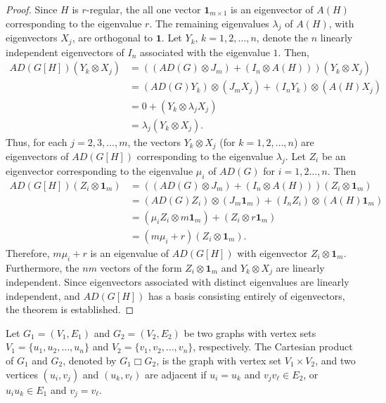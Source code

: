 \documentclass[12pt]{article}
\numberwithin{equation}{section}
\begin{document}
\begin{proof}
		Since $H$ is $r$-regular, the all one vector $\bm{1}_{m \times 1}$ is an eigenvector of $A(H)$ corresponding to the eigenvalue $r$. The remaining eigenvalues $\lambda_j$ of $A(H)$, with eigenvectors $X_j$, are orthogonal to $\bm{1}$. Let $Y_k$, $k = 1,2,\dots,n$, denote the $n$ linearly independent eigenvectors of $I_n$ associated with the eigenvalue $1$. Then, 
			 	\[\begin{aligned}
			AD(G[H]) (Y_k \otimes X_j)& =\left((AD(G) \otimes J_m) + (I_n \otimes A(H))\right) (Y_k \otimes X_j)\\
			&= (AD(G) Y_k) \otimes (J_m X_j) + (I_n Y_k) \otimes (A(H) X_j)\\
			&= 0 + (Y_k \otimes \lambda_j X_j)\\
			&= \lambda_j (Y_k \otimes X_j).
		\end{aligned}\]
		Thus,	for each $j = 2,3,\dots,m$, the vectors $Y_k \otimes X_j$ (for $k = 1,2,\dots,n$) are eigenvectors of $AD(G[H])$ corresponding to the eigenvalue $\lambda_j$. 		
		Let $Z_i$ be an eigenvector corresponding to the eigenvalue $\mu_i$ of $AD(G)$ for $i=1,2\ldots,n$. Then
		\[\begin{aligned}
				AD(G[H]) (Z_i \otimes \bm{1}_m)& =\left((AD(G) \otimes J_m) + (I_n \otimes A(H))\right) (Z_i \otimes \bm{1}_m)\\
			&= (AD(G) Z_i) \otimes (J_m \bm{1}_m ) + (I_n Z_i) \otimes (A(H)  \bm{1}_m)\\
			&= (\mu_iZ_i \otimes m\bm{1}_m)+ (Z_i \otimes r\bm{1}_m)\\
			&= (m\mu_i+r) (Z_i \otimes \bm{1}_m).
		\end{aligned}\]
		Therefore, $m\mu_i+r$ is an eigenvalue of $AD(G[H])$ with eigenvector $Z_i \otimes \bm{1}_m$. Furthermore, the $nm$ vectors of the form $Z_i \otimes \bm{1}_m$ and $Y_k \otimes X_j$ are linearly independent. Since eigenvectors associated with distinct eigenvalues are linearly independent, and $AD(G[H])$ has a basis consisting entirely of eigenvectors, the theorem is established.
		\end{proof}
		
		 Let $G_1 = (V_1, E_1)$ and $G_2 = (V_2, E_2)$ be two graphs with vertex sets $V_1 = \{u_1, u_2, \dots, u_n\}$ and $V_2 = \{v_1, v_2, \dots, v_n\}$, respectively. The Cartesian product of $G_1$ and $G_2$, denoted by $G_1 \Box G_2$, is the graph with vertex set $V_1 \times V_2$, and two vertices $(u_i, v_j)$ and $(u_k, v_\ell)$ are adjacent if	$u_i = u_k$ and $v_jv_\ell \in E_2$, or $u_iu_k \in E_1$ and $v_j = v_\ell$.
		
\end{document}
